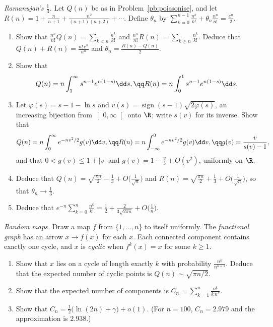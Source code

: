\begin{exercise}[$\star\star\star$]\label{pb:ramanujan}
\emph{Ramanujan's $\frac13$.} Let $Q(n)$ be as in Problem~\ref{pb:poissonise}, and let $R(n)=1+\frac n{n+1}+\frac{n^2}{(n+1)(n+2)}+\cdots$. Define $\theta_n$ by $\sum_{k=0}^{n-1}\frac{n^k}{k!}+\theta_n\frac{n^n}{n!}=\frac{e^n}2$.
\begin{enumerate}[label=(\alph*)]
\item Show that $\frac{n^n}{n!}Q(n)=\sum_{k<n}\frac{n^k}{k!}$ and $\frac{n^n}{n!}R(n)=\sum_{k\ge n}\frac{n^k}{k!}$. Deduce that $Q(n)+R(n)=\frac{n!\,e^n}{n^n}$ and $\theta_n=\frac{R(n)-Q(n)}2$.
\item Show that
\[
Q(n)=n\int_1^\infty s^{n-1}e^{n(1-s)}\dd s,\qq R(n)=n\int_0^1s^{n-1}e^{n(1-s)}\dd s.
\]
\item Let $\varphi(s)=s-1-\ln s$ and $v(s)=\operatorname{sign}(s-1)\sqrt{2\varphi(s)}$, an increasing bijection from $\left]0,\infty\right[$ onto $\R$; write $s(v)$ for its inverse.
Show that
\[
Q(n)=n\int_0^\infty e^{-nv^2/2}g(v)\dd v,\qq R(n)=n\int_{-\infty}^0e^{-nv^2/2}g(v)\dd v,\qq g(v)=\frac v{s(v)-1},
\]
and that $0<g(v)\le1+|v|$ and $g(v)=1-\frac v3+O(v^2)$, uniformly on $\R$.
\item Deduce that $Q(n)=\sqrt{\frac{\pi n}2}-\frac13+O\bigl(\frac1{\sqrt n}\bigr)$ and $R(n)=\sqrt{\frac{\pi n}2}+\frac13+O\bigl(\frac1{\sqrt n}\bigr)$, so that $\theta_n\to\frac13$.
\item Deduce that $e^{-n}\sum_{k=0}^n\frac{n^k}{k!}=\frac12+\frac2{3\sqrt{2\pi n}}+O\bigl(\frac1n\bigr)$.
\end{enumerate}
\end{exercise}

\begin{exercise}[$\star\star$]\label{pb:mappings}
\emph{Random maps.} Draw a map $f$ from $\{1,\dots,n\}$ to itself uniformly. The \emph{functional graph} has an arrow $x\to f(x)$ for each $x$. Each connected component contains exactly one cycle, and $x$ is \emph{cyclic} when $f^k(x)=x$ for some $k\ge1$.
\begin{enumerate}[label=(\alph*)]
\item Show that $x$ lies on a cycle of length exactly $k$ with probability $\frac{n^{\underline k}}{n^{k+1}}$. Deduce that the expected number of cyclic points is
$Q(n)\sim\sqrt{\pi n/2}$.
\item Show that the expected number of components is $C_n=\sum_{k=1}^n\frac{n^{\underline k}}{k\,n^k}$.
\item Show that $C_n=\frac12\bigl(\ln(2n)+\gamma\bigr)+o(1)$. (For $n=100$, $C_n=2.979$ and the approximation is $2.938$.)
\end{enumerate}
\end{exercise}

